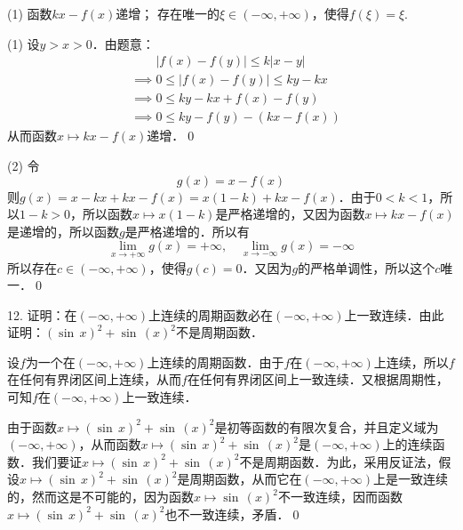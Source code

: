 \begin{tasks}(1)
    \task 函数$kx - f(x)$递增；
    \task 存在唯一的$\xi \in (-\infty, +\infty)$，使得$f(\xi) = \xi$.
\end{tasks}

(1) \prove 设$y > x > 0$．由题意：
\begin{align}
    &\mathrel{\phantom{\implies}} \lvert f(x) - f(y) \rvert \leq k \lvert x - y \rvert \\
    &\implies 0 \leq \lvert f(x) - f(y) \rvert \leq ky - kx \\ 
    &\implies 0 \leq ky - kx + f(x) - f(y) \\
    &\implies 0 \leq ky - f(y) - (kx - f(x))
\end{align}
从而函数$x \mapsto kx - f(x)$递增．\qed\bigskip

(2) \prove 令
\begin{equation}
    g(x) = x - f(x)
\end{equation}
则$g(x) = x - kx + kx - f(x) = x(1-k) + kx - f(x)$．由于$0 < k < 1$，所以$1-k > 0$，所以函数$x \mapsto x(1-k)$是严格递增的，又因为函数$x \mapsto kx - f(x)$是递增的，所以函数$g$是严格递增的．所以有
\begin{equation}
    \lim_{x \to +\infty} g(x) = +\infty, \quad \lim_{x \to -\infty} g(x) = -\infty
\end{equation}
所以存在$c \in (-\infty, +\infty)$，使得$g(c) = 0$．又因为$g$的严格单调性，所以这个$c$唯一．\qed\bigskip

12. 证明：在$(-\infty, +\infty)$上连续的周期函数必在$(-\infty, +\infty)$上一致连续．由此证明：$\left(\sin \, x\right)^2 + \sin \, \left(x\right)^2$不是周期函数．

\prove 设$f$为一个在$(-\infty,+\infty)$上连续的周期函数．由于$f$在$(-\infty,+\infty)$上连续，所以$f$在任何有界闭区间上连续，从而$f$在任何有界闭区间上一致连续．又根据周期性，可知$f$在$(-\infty,+\infty)$上一致连续．

由于函数$x \mapsto \left( \sin \, x\right)^2 + \sin \, \left(x\right)^2$是初等函数的有限次复合，并且定义域为$(-\infty, +\infty)$，从而函数$x \mapsto \left(\sin \, x\right)^2 + \sin \, \left(x\right)^2$是$(-\infty, +\infty)$上的连续函数．我们要证$x \mapsto \left(\sin \, x\right)^2 + \sin \, \left(x\right)^2$不是周期函数．为此，采用反证法，假设$x \mapsto \left(\sin \, x\right)^2 + \sin \, \left(x\right)^2$是周期函数，从而它在$(-\infty,+\infty)$上是一致连续的，然而这是不可能的，因为函数$x \mapsto \sin \, \left(x\right)^2$不一致连续，因而函数$x \mapsto \left(\sin \, x\right)^2 + \sin \, \left(x\right)^2$也不一致连续，矛盾．\qed\bigskip